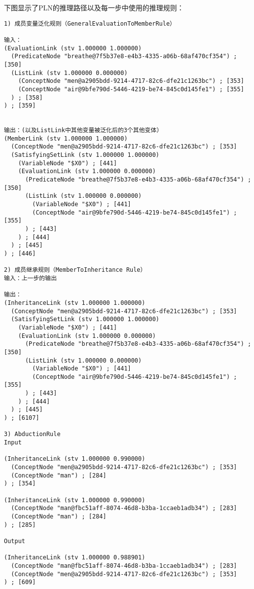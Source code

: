 下图显示了PLN的推理路径以及每一步中使用的推理规则：

{\tt\begin{small}\begin{lstlisting}
1) 成员变量泛化规则（GeneralEvaluationToMemberRule）

输入：
(EvaluationLink (stv 1.000000 1.000000)
  (PredicateNode "breathe@7f5b37e8-e4b3-4335-a06b-68af470cf354") ; [350]
  (ListLink (stv 1.000000 0.000000)
    (ConceptNode "men@a2905bdd-9214-4717-82c6-dfe21c1263bc") ; [353]
    (ConceptNode "air@9bfe790d-5446-4219-be74-845c0d145fe1") ; [355]
  ) ; [358]
) ; [359]


输出：(以及ListLink中其他变量被泛化后的3个其他变体）
(MemberLink (stv 1.000000 1.000000)
  (ConceptNode "men@a2905bdd-9214-4717-82c6-dfe21c1263bc") ; [353]
  (SatisfyingSetLink (stv 1.000000 1.000000)
    (VariableNode "$X0") ; [441]
    (EvaluationLink (stv 1.000000 0.000000)
      (PredicateNode "breathe@7f5b37e8-e4b3-4335-a06b-68af470cf354") ; [350]
      (ListLink (stv 1.000000 0.000000)
        (VariableNode "$X0") ; [441]
        (ConceptNode "air@9bfe790d-5446-4219-be74-845c0d145fe1") ; [355]
      ) ; [443]
    ) ; [444]
  ) ; [445]
) ; [446]

2) 成员继承规则（MemberToInheritance Rule）
输入：上一步的输出

输出：
(InheritanceLink (stv 1.000000 1.000000)
  (ConceptNode "men@a2905bdd-9214-4717-82c6-dfe21c1263bc") ; [353]
  (SatisfyingSetLink (stv 1.000000 1.000000)
    (VariableNode "$X0") ; [441]
    (EvaluationLink (stv 1.000000 0.000000)
      (PredicateNode "breathe@7f5b37e8-e4b3-4335-a06b-68af470cf354") ; [350]
      (ListLink (stv 1.000000 0.000000)
        (VariableNode "$X0") ; [441]
        (ConceptNode "air@9bfe790d-5446-4219-be74-845c0d145fe1") ; [355]
      ) ; [443]
    ) ; [444]
  ) ; [445]
) ; [6107]

3) AbductionRule
Input

(InheritanceLink (stv 1.000000 0.990000)
  (ConceptNode "men@a2905bdd-9214-4717-82c6-dfe21c1263bc") ; [353]
  (ConceptNode "man") ; [284]
) ; [354]

(InheritanceLink (stv 1.000000 0.990000)
  (ConceptNode "man@fbc51aff-8074-46d8-b3ba-1ccaeb1adb34") ; [283]
  (ConceptNode "man") ; [284]
) ; [285]

Output

(InheritanceLink (stv 1.000000 0.988901)
  (ConceptNode "man@fbc51aff-8074-46d8-b3ba-1ccaeb1adb34") ; [283]
  (ConceptNode "men@a2905bdd-9214-4717-82c6-dfe21c1263bc") ; [353]
) ; [609]


\end{lstlisting}
\end{small}}
